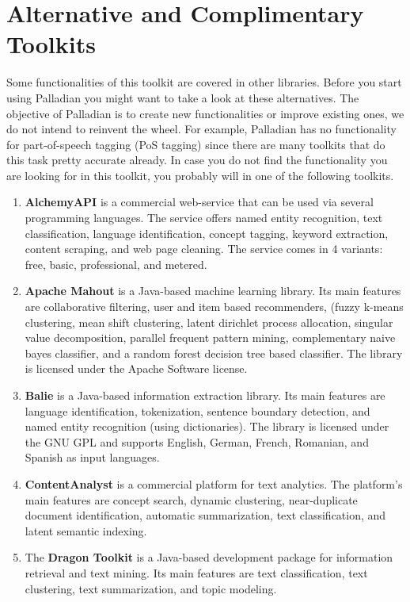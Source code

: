 \documentclass[a4paper,twoside]{book}      %
\begin{document}
\section{Alternative and Complimentary Toolkits}
\label{sec:alternativesToPalladian}
Some functionalities of this toolkit are covered in other libraries. Before you start using Palladian you might want to take a look at these alternatives. The objective of Palladian is to create new functionalities or improve existing ones, we do not intend to reinvent the wheel. For example, Palladian has no functionality for part-of-speech tagging (PoS tagging) since there are many toolkits that do this task pretty accurate already. In case you do not find the functionality you are looking for in this toolkit, you probably will in one of the following toolkits.

\begin{enumerate}
\item \textbf{AlchemyAPI} \cite{alchemyapi} is a commercial web-service that can be used via several programming languages. The service offers named entity recognition, text classification, language identification, concept tagging, keyword extraction, content scraping, and web page cleaning.
The service comes in 4 variants: free, basic, professional, and metered.
\item \textbf{Apache Mahout} \cite{settings2apache} is a Java-based machine learning library. Its main features are collaborative filtering, user and item based recommenders, (fuzzy k-means clustering, mean shift clustering, latent dirichlet process allocation, singular value decomposition, parallel frequent pattern mining, complementary naive bayes classifier, and a random forest decision tree based classifier.
The library is licensed under the Apache Software license.
\item \textbf{Balie} \cite{balie} is a Java-based information extraction library. Its main features are language identification, tokenization, sentence boundary detection, and named entity recognition (using dictionaries).
The library is licensed under the GNU GPL and supports English, German, French, Romanian, and Spanish as input languages.
\item \textbf{ContentAnalyst} \cite{contentanalyst} is a commercial platform for text analytics. The platform's main features are concept search, dynamic clustering, near-duplicate document identification, automatic summarization, text classification, and latent semantic indexing.
\item The \textbf{Dragon Toolkit} \cite{zhou2007dragon} is a Java-based development package for information retrieval and text mining. Its main features are text classification, text clustering, text summarization, and topic modeling.

\end{enumerate}
\end{document}
